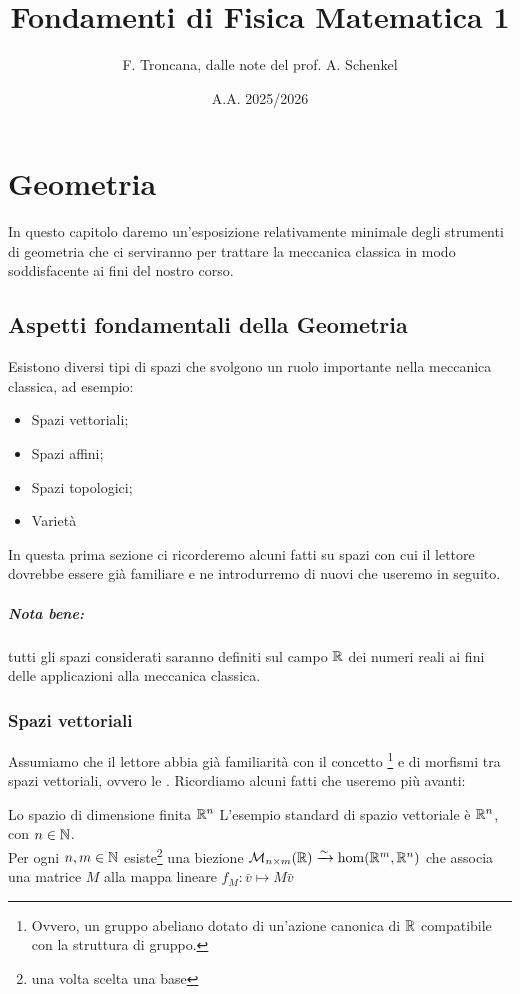 \documentclass[openany]{book}
\title{Fondamenti di Fisica Matematica 1}
\author{F. Troncana, dalle note del prof. A. Schenkel}
\date{A.A. 2025/2026}
\begin{document}
\maketitle

\tableofcontents

\chapter{Geometria}

In questo capitolo daremo un'esposizione relativamente minimale degli strumenti di geometria che ci serviranno per trattare la meccanica classica in modo soddisfacente ai fini del nostro corso.

\section{Aspetti fondamentali della Geometria}

Esistono diversi tipi di spazi che svolgono un ruolo importante nella meccanica classica, ad esempio:\begin{itemize}
    \item Spazi vettoriali;
    \item Spazi affini;
    \item Spazi topologici;
    \item Varietà
\end{itemize}
In questa prima sezione ci ricorderemo alcuni fatti su spazi con cui il lettore dovrebbe essere già familiare e ne introdurremo di nuovi che useremo in seguito.
\paragraph{Nota bene:} tutti gli spazi considerati saranno definiti sul campo $\mathbb{R}$ dei numeri reali ai fini delle applicazioni alla meccanica classica. 

\subsection{Spazi vettoriali}

Assumiamo che il lettore abbia già familiarità con il concetto \footnote{Ovvero, un gruppo abeliano dotato di un'azione canonica di $\mathbb{R}$ compatibile con la struttura di gruppo.} e di morfismi tra spazi vettoriali, ovvero le . Ricordiamo alcuni fatti che useremo più avanti:

\begin{example}{Lo spazio di dimensione finita $\mathbb{R}^n$}{}
    L'esempio standard di spazio vettoriale è $\mathbb{R}^n$, con $n \in \mathbb{N}$.\\
    Per ogni $n, m \in \mathbb{N}$ esiste\footnote{una volta scelta una base} una biezione $\mathcal{M}_{n\times m}(\mathbb{R}) \xrightarrow{\sim} \hom(\mathbb{R}^m,\mathbb{R}^n)$ che associa una matrice $M$ alla mappa lineare $f_M : \bar{v}\mapsto M\bar{v}$
\end{example}
\end{document}
